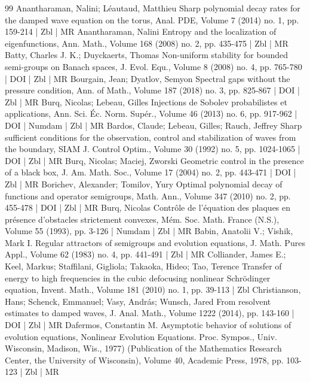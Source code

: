 \begin{thebibliography}{99}
Anantharaman, Nalini; Léautaud, Matthieu Sharp polynomial decay rates for the damped wave equation on the torus, Anal. PDE, Volume 7 (2014) no. 1, pp. 159-214 | Zbl | MR
Anantharaman, Nalini Entropy and the localization of eigenfunctions, Ann. Math., Volume 168 (2008) no. 2, pp. 435-475 | Zbl | MR
Batty, Charles J. K.; Duyckaerts, Thomas Non-uniform stability for bounded semi-groups on Banach spaces, J. Evol. Equ., Volume 8 (2008) no. 4, pp. 765-780 | DOI | Zbl | MR
Bourgain, Jean; Dyatlov, Semyon Spectral gaps without the pressure condition, Ann. of Math., Volume 187 (2018) no. 3, pp. 825-867 | DOI | Zbl | MR
Burq, Nicolas; Lebeau, Gilles Injections de Sobolev probabilistes et applications, Ann. Sci. Éc. Norm. Supér., Volume 46 (2013) no. 6, pp. 917-962 | DOI | Numdam | Zbl | MR
Bardos, Claude; Lebeau, Gilles; Rauch, Jeffrey Sharp sufficient conditions for the observation, control and stabilization of waves from the boundary, SIAM J. Control Optim., Volume 30 (1992) no. 5, pp. 1024-1065 | DOI | Zbl | MR
Burq, Nicolas; Maciej, Zworski Geometric control in the presence of a black box, J. Am. Math. Soc., Volume 17 (2004) no. 2, pp. 443-471 | DOI | Zbl | MR
Borichev, Alexander; Tomilov, Yury Optimal polynomial decay of functions and operator semigroups, Math. Ann., Volume 347 (2010) no. 2, pp. 455-478 | DOI | Zbl | MR
Burq, Nicolas Contrôle de l’équation des plaques en présence d’obstacles strictement convexes, Mém. Soc. Math. France (N.S.), Volume 55 (1993), pp. 3-126 | Numdam | Zbl | MR
Babin, Anatolii V.; Vishik, Mark I. Regular attractors of semigroups and evolution equations, J. Math. Pures Appl., Volume 62 (1983) no. 4, pp. 441-491 | Zbl | MR
Colliander, James E.; Keel, Markus; Staffilani, Gigliola; Takaoka, Hideo; Tao, Terence Transfer of energy to high frequencies in the cubic defocusing nonlinear Schrödinger equation, Invent. Math., Volume 181 (2010) no. 1, pp. 39-113 | Zbl
Christianson, Hans; Schenck, Emmanuel; Vasy, András; Wunsch, Jared From resolvent estimates to damped waves, J. Anal. Math., Volume 1222 (2014), pp. 143-160 | DOI | Zbl | MR
Dafermos, Constantin M. Asymptotic behavior of solutions of evolution equations, Nonlinear Evolution Equations. Proc. Sympos., Univ. Wisconsin, Madison, Wis., 1977) (Publication of the Mathematics Research Center, the University of Wisconsin), Volume 40, Academic Press, 1978, pp. 103-123 | Zbl | MR

\end{thebibliography}
